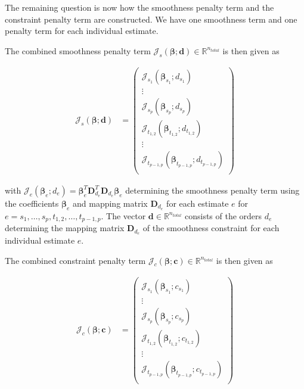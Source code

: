 \documentclass[10pt,a4paper]{article}
\begin{document}
	The remaining question is now how the smoothness penalty term and the constraint penalty term are constructed. We have one smoothness term and one penalty term for each individual estimate. 
	
	The combined smoothness penalty term $\boldsymbol{\mathcal{J}}_s(\boldsymbol{\beta}; \boldsymbol{d}) \in \mathbb{R}^{n_{total}}$ is then given as
	
	\begin{align}\label{eq:J_s_ndim}
		\boldsymbol{\mathcal{J}}_s(\boldsymbol{\beta}; \boldsymbol{d}) &= 
			\begin{pmatrix}
				\mathcal J_{s_1}(\boldsymbol{\beta}_{s_1}; d_{s_1}) \\ 
				\vdots \\ 
				\mathcal J_{s_p}(\boldsymbol{\beta}_{s_p}; d_{s_p}) \\
				\mathcal J_{t_{1,2}}(\boldsymbol{\beta}_{t_{1,2}}; d_{t_{1,2}}) \\
				\vdots \\
				\mathcal J_{t_{p-1,p}}(\boldsymbol{\beta}_{t_{p-1,p}}; d_{t_{p-1,p}}) \\
			\end{pmatrix}
	\end{align}
	
	with $\mathcal J_e(\boldsymbol{\beta}_e; d_e) = \boldsymbol{\beta}_e^T \boldsymbol{D}_{d_e}^T \boldsymbol{D}_{d_e} \boldsymbol{\beta}_e$ determining the smoothness penalty term using the coefficients $\boldsymbol{\beta}_e$ and mapping matrix $\boldsymbol{D}_{d_e}$ for each estimate $e$ for $e=s_1, \dots, s_p, t_{1,2}, \dots, t_{p-1,p}$. The vector $\boldsymbol{d} \in \mathbb{R}^{n_{total}}$ consists of the orders $d_e$ determining the mapping matrix $\boldsymbol{D}_{d_e}$ of the smoothness constraint for each individual estimate $e$. 
	
	The combined constraint penalty term $\boldsymbol{\mathcal{J}}_c(\boldsymbol{\beta}; \boldsymbol{c}) \in \mathbb{R}^{n_{total}}$ is then given as
	
	\begin{align}\label{eq:J_c_ndim}
		\boldsymbol{\mathcal{J}}_c(\boldsymbol{\beta}; \boldsymbol{c}) &= 
		\begin{pmatrix}
		\mathcal J_{s_1}(\boldsymbol{\beta}_{s_1}; c_{s_1}) \\ 
		\vdots \\ 
		\mathcal J_{s_p}(\boldsymbol{\beta}_{s_p}; c_{s_p}) \\
		\mathcal J_{t_{1,2}}(\boldsymbol{\beta}_{t_{1,2}}; c_{t_{1,2}}) \\
		\vdots \\
		\mathcal J_{t_{p-1,p}}(\boldsymbol{\beta}_{t_{p-1,p}}; c_{t_{p-1,p}}) \\
		\end{pmatrix}
	\end{align}
\end{document}
